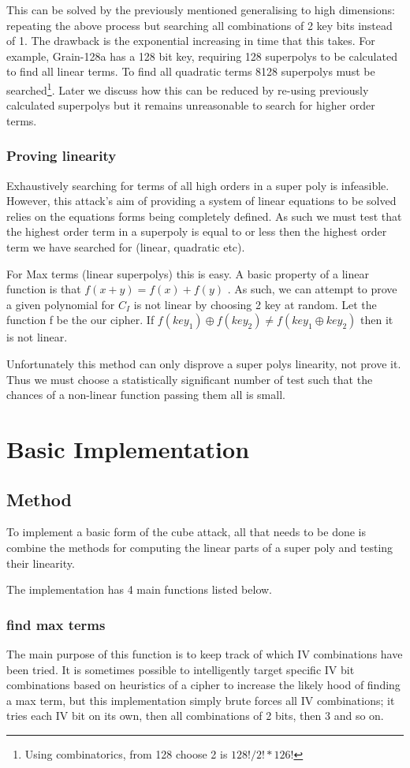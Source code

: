 \documentclass{report}
\let\Oldsection\section
\renewcommand{\section}{\FloatBarrier\Oldsection}
\let\Oldsubsection\subsection
\renewcommand{\subsection}{\FloatBarrier\Oldsubsection}
\let\Oldsubsubsection\subsubsection
\renewcommand{\subsubsection}{\FloatBarrier\Oldsubsubsection}
\begin{document}
This can be solved by the previously mentioned generalising to high dimensions: repeating the above process but searching all combinations of 2 key bits instead of 1. The drawback is the exponential increasing in time that this takes. For example, Grain-128a has a 128 bit key, requiring 128 superpolys to be calculated to find all linear terms. To find all quadratic terms 8128 superpolys must be searched\footnote{Using combinatorics, from 128 choose 2 is $128!/2!*126!$}. Later we discuss how this can be reduced by re-using previously calculated superpolys but it remains unreasonable to search for higher order terms.
\subsubsection{Proving linearity}
Exhaustively searching for terms of all high orders in a super poly is infeasible. However, this attack's aim of providing a system of linear equations to be solved relies on the equations forms being completely defined. As such we must test that the highest order term in a superpoly is equal to or less then the highest order term we have searched for (linear, quadratic etc).

For Max terms (linear superpolys) this is easy. A basic property of a linear function is that $f(x+y)=f(x)+f(y)$ \cite{linearproperties}.
As such, we can attempt to prove a given polynomial for $C_I$ is not linear by choosing 2 key at random. Let the function f be the our cipher. If $f(key_1)\oplus f(key_2) \neq f(key_1 \oplus key_2)$ then it is not linear.

Unfortunately this method can only disprove a super polys linearity, not prove it. Thus we must choose a statistically significant number of test such that the chances of a non-linear function passing them all is small.%

\section{Basic Implementation}
\subsection{Method}
To implement a basic form of the cube attack, all that needs to be done is combine the methods for computing the linear parts of a super poly and testing their linearity.

The implementation has 4 main functions listed below.

\subsubsection{find max terms}
The main purpose of this function is to keep track of which IV combinations have been tried. It is sometimes possible to intelligently target specific IV bit combinations based on heuristics of a cipher to increase the likely hood of finding a max term, but this implementation simply brute forces all IV combinations; it tries each IV bit on its own, then all combinations of 2 bits, then 3 and so on.
\end{document}
